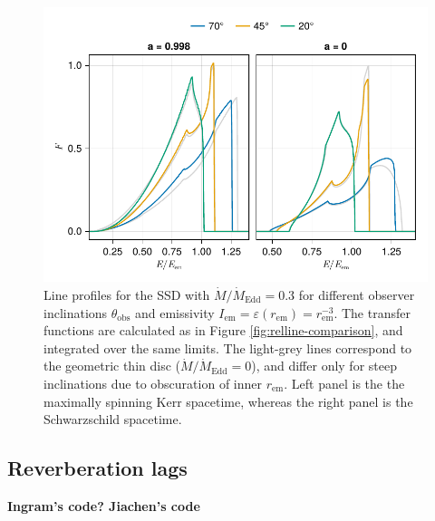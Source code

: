 \documentclass[fleqn,usenatbib]{mnras}
\newcommand{\todo}[1]{{\bf \color{red} #1}}
\begin{document}
\begin{figure}
	\centering
	\includegraphics[width=0.99\linewidth]{figures/lineprofiles.ssd.pdf}
	\caption{Line profiles for the SSD with $\dot{M} / \dot{M}_\text{Edd} = 0.3$ for different observer inclinations $\theta_\text{obs}$ and emissivity $I_\text{em} = \varepsilon(r_\text{em}) = r_\text{em}^{-3}$. The transfer functions are calculated as in Figure \ref{fig:relline-comparison}, and integrated over the same limits. The light-grey lines correspond to the geometric thin disc ($\dot{M} / \dot{M}_\text{Edd} = 0$), and differ only for steep inclinations due to obscuration of inner $r_\text{em}$. Left panel is the the maximally spinning Kerr spacetime, whereas the right panel is the Schwarzschild spacetime.}
	\label{fig:line-profile-ssd}
\end{figure}


\subsection{Reverberation lags}
\label{sec:lag-transfer-functions}

\citep{reynolds_x-ray_1999,wilkins_origin_2013,cackett_modelling_2014}

\todo{Ingram's code? Jiachen's code}
\end{document}
